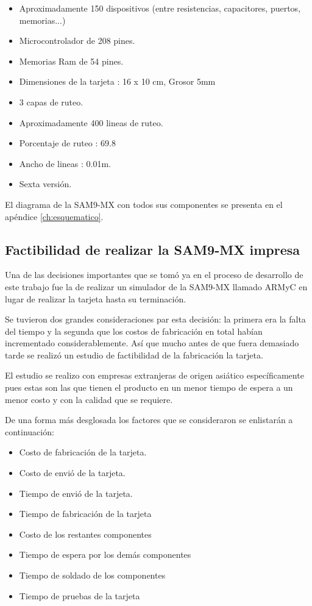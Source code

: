 \begin{itemize}
\item Aproximadamente 150 dispositivos (entre resistencias, capacitores, puertos, memorias...)
\item Microcontrolador de 208 pines.
\item Memorias Ram de 54 pines.
\item Dimensiones de la tarjeta : 16 x 10 cm, Grosor 5mm
\item 3 capas de ruteo.
\item Aproximadamente 400 lineas de ruteo.
\item Porcentaje de ruteo : 69.8%
\item Ancho de lineas : 0.01m.
\item Sexta versión.
\end{itemize}

El diagrama de la SAM9-MX con todos sus componentes se presenta en el apéndice
\ref{ch:esquematico}.

\subsection{Factibilidad de realizar la SAM9-MX impresa}

Una de las decisiones importantes que se tomó ya en el proceso de desarrollo de este trabajo fue la de realizar un simulador de la SAM9-MX llamado ARMyC en lugar de realizar la tarjeta hasta su terminación.

Se tuvieron dos grandes consideraciones par esta decisión: la primera era la falta del tiempo y la segunda que los costos de fabricación en total habían incrementado considerablemente. Así que mucho antes de que fuera demasiado tarde se realizó un estudio de factibilidad de la fabricación la tarjeta. 

El estudio se realizo con empresas extranjeras de origen asiático específicamente pues estas son las que tienen el producto en un menor tiempo de espera a un menor costo y con la calidad que se requiere.

De una forma más desglosada los factores que se consideraron se enlistarán a continuación:

\begin{itemize}
\item Costo de fabricación de la tarjeta.
\item Costo de envió de la tarjeta.
\item Tiempo de envió de la tarjeta.
\item Tiempo de fabricación de la tarjeta
\item Costo de los restantes componentes
\item Tiempo de espera por los demás componentes
\item Tiempo de soldado de los componentes
\item Tiempo de pruebas de la tarjeta
\end{itemize}

